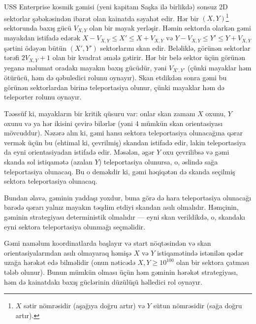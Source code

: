 \documentclass[12pt]{article}
\begin{document}
\renewcommand{\headerLang}{Azerbaijani}
\renewcommand{\problemName}{AB13. Baxış (Vision)}

\renewcommand{\headerLeft}{IATI Gün 1, Yuxarı yaş qrupu}
\renewcommand{\headerRightFirst}{XVII BEYNƏLXALQ QABAQCIL İNFORMATİKA TURNİRİ}
\renewcommand{\headerRightSecond}{ONLAYN 2026}

\renewcommand{\tl}{$5$ s}
\renewcommand{\ml}{$1024$ MB}
\problem{Tapşırıq \problemName}

USS Enterprise kosmik gəmisi (yeni kapitanı Saşka ilə birlikdə) sonsuz 2D sektorlar şəbəkəsindən ibarət olan kainatda səyahət edir. Hər bir $(X, Y)$\footnote{$X$ sətir nömrəsidir (aşağıya doğru artır) və $Y$ sütun nömrəsidir (sağa doğru artır).} sektorunda baxış gücü $V_{X, Y}$ olan bir mayak yerləşir. Həmin sektorda olarkən gəmi mayakdan istifadə edərək $X - V_{X, Y} \leq X' \leq X + V_{X, Y}$ və $Y - V_{X, Y} \leq Y' \leq Y + V_{X, Y}$ şərtini ödəyən bütün $(X', Y')$ sektorlarını skan edir. Beləliklə, görünən sektorlar tərəfi $2V_{X, Y} + 1$ olan bir kvadrat əmələ gətirir. Hər bir belə sektor üçün görünən yeganə məlumat oradakı mayakın baxış gücüdür, yəni $V_{X', Y'}$ (çünki mayaklar həm ötürücü, həm də qəbuledici rolunu oynayır). Skan etdikdən sonra gəmi bu görünən sektorlardan birinə teleportasiya olunur, çünki mayaklar həm də teleporter rolunu oynayır.

Təəssüf ki, mayakların bir kritik qüsuru var: onlar skan zamanı $X$ oxunu, $Y$ oxunu və ya hər ikisini çevirə bilərlər (yəni 4 mümkün skan orientasiyası mövcuddur). Nəzərə alın ki, gəmi hansı sektora teleportasiya olunacağına qərar vermək üçün bu (ehtimal ki, çevrilmiş) skandan istifadə edir, lakin teleportasiya da eyni orientasiyadan istifadə edir. Məsələn, əgər $Y$ oxu çevrilibsə və gəmi skanda sol istiqamətə (azalan $Y$) teleportasiya olunursa, o, əslində sağa teleportasiya olunacaq. Bu o deməkdir ki, gəmi həqiqətən də skanda seçilmiş sektora teleportasiya olunacaq.

Bundan əlavə, gəminin yaddaşı yoxdur, buna görə də hara teleportasiya olunacağı barədə qərarı yalnız mayakın təqdim etdiyi skandan asılı olmalıdır. Həmçinin, gəminin strategiyası deterministik olmalıdır — eyni skan verildikdə, o, skandakı eyni sektora teleportasiya olunmağı seçməlidir.

Gəmi naməlum koordinatlarda başlayır və start nöqtəsindən və skan orientasiyalarından asılı olmayaraq həmişə $X$ və $Y$ istiqamətində istənilən qədər uzağa hərəkət edə bilməlidir (onun nəticədə $X, Y \geq 10^{100}$ olan bir sektora çatması tələb olunur). Bunun mümkün olması üçün həm gəminin hərəkət strategiyası, həm də kainatdakı baxış güclərinin düzülüşü həlledici rol oynayır.
\end{document}
